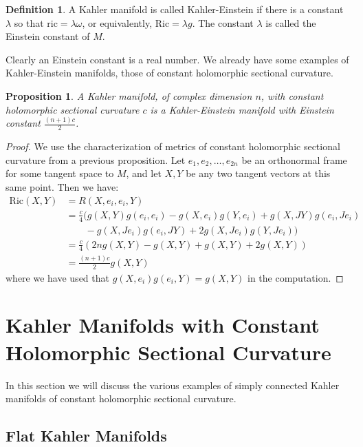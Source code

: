 \documentclass[11pt]{amsart}
\newtheorem{prop}[subsection]{Proposition}
\theoremstyle{definition}
\newtheorem{definition}[subsection]{Definition}
\def \Ric{ \text{Ric} }
\def \ric{ \text{ric} }
\begin{document}
\begin{definition} A Kahler manifold is called Kahler-Einstein if there is a constant $\lambda$ so that $\ric = \lambda \omega$, or equivalently, $\Ric = \lambda g$.  The constant $\lambda $ is called the Einstein constant of $M$.
\end{definition}

Clearly an Einstein constant is a real number.  We already have some examples of Kahler-Einstein manifolds, those of constant holomorphic sectional curvature.

\begin{prop} A Kahler manifold, of complex dimension $n$, with constant holomorphic sectional curvature $c$ is a Kahler-Einstein manifold with Einstein constant $\frac{(n+1)c}{2}$.
\end{prop}

\begin{proof}
%
We use the characterization of metrics of constant holomorphic sectional curvature from a previous proposition.  Let $e_1, e_2, \ldots, e_{2n}$ be an orthonormal frame for some tangent space to $M$, and let $X, Y$ be any two tangent vectors at this same point.  Then we have:
%
\begin{align*}
\Ric(X,Y) &= R(X, e_i, e_i, Y) \\
&= \frac{c}{4} ( g(X,Y)g(e_i,e_i) - g(X,e_i)g(Y,e_i) + g(X, JY)g(e_i, Je_i) \\
& \qquad - g(X,Je_i)g(e_i,JY) + 2g(X,Je_i)g(Y,Je_i) ) \\
&= \frac{c}{4}( 2n g(X,Y) - g(X,Y) + g(X,Y) + 2g(X,Y) ) \\
&= \frac{ (n+1) c }{2} g(X,Y)
\end{align*}
%
where we have used that $g(X,e_i)g(e_i,Y) = g(X,Y)$ in the computation.
%
\end{proof}

\section{ Kahler Manifolds with Constant Holomorphic Sectional Curvature }

In this section we will discuss the various examples of simply connected Kahler manifolds of constant holomorphic sectional curvature.

\subsection{Flat Kahler Manifolds}
\end{document}
